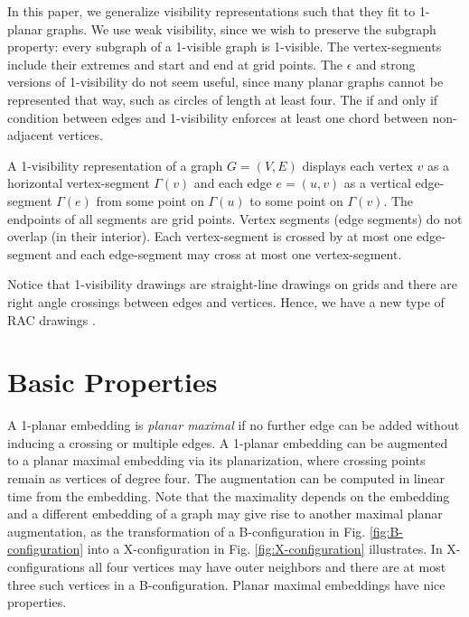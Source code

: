 \documentclass[runningheads]{llncs}
\begin{document}
In this paper, we generalize visibility representations such that
they fit to 1-planar graphs. We use weak visibility, since we wish
to preserve the subgraph property: every subgraph of a 1-visible
graph is 1-visible. The vertex-segments include their extremes and
start and end at grid points. The $\epsilon$ and strong versions of
1-visibility do not seem useful, since many planar graphs cannot be
represented that way, such as circles of length at least four. The
if and only if condition between edges and 1-visibility enforces at
least one chord between non-adjacent vertices.

\begin{definition}
A 1-visibility representation of a graph $G=(V,E)$ displays each
vertex $v$ as a horizontal vertex-segment $\Gamma(v)$ and each edge
$e=(u, v)$ as a vertical edge-segment $\Gamma(e)$ from some point on
$\Gamma(u)$ to some point on $\Gamma(v)$.  The endpoints of all
segments are grid points. Vertex segments (edge segments) do not
overlap (in their interior).  Each vertex-segment is crossed by at
most one edge-segment and each edge-segment  may cross at most one
vertex-segment.
\end{definition}

Notice that 1-visibility drawings are straight-line drawings on
grids and there are right angle crossings between edges and
vertices. Hence, we have a new type of  RAC drawings
\cite{del-dgrac-11,el-racg1p-13}.



\section{Basic Properties}


A 1-planar embedding is \textit{planar maximal} if no further edge
can be added without inducing a crossing or multiple edges.  A
1-planar embedding can be augmented to a planar maximal embedding
via its planarization, where crossing points remain as vertices of
degree four. The augmentation can be computed in linear time from
the embedding. Note that the maximality depends on the embedding and
a different embedding of a graph may give rise to another maximal
planar augmentation, as the transformation of a B-configuration in
Fig. \ref{fig:B-configuration} into a X-configuration in Fig.
\ref{fig:X-configuration} illustrates. In X-configurations all four
vertices may have outer neighbors and there are at most three such
vertices in a B-configuration. Planar maximal embeddings have nice
properties.
\end{document}
